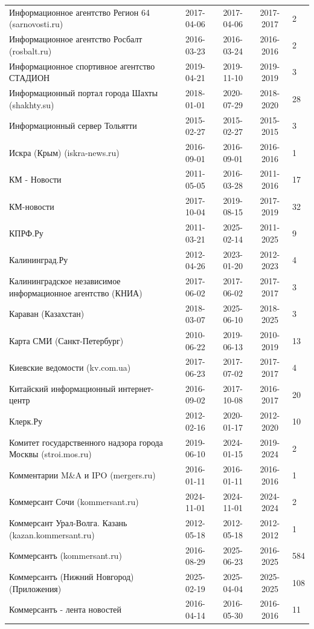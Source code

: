 \begin{longtable}{p{6cm}cccp{2cm}}
Информационное агентство Регион 64 (sarnovosti.ru) & 2017-04-06 & 2017-04-06 & 2017-2017 & 2\\
Информационное агентство Росбалт (rosbalt.ru) & 2016-03-23 & 2016-03-24 & 2016-2016 & 2\\
Информационное спортивное агентство СТАДИОН & 2019-04-21 & 2019-11-10 & 2019-2019 & 3\\
Информационный портал города Шахты (shakhty.su) & 2018-01-01 & 2020-07-29 & 2018-2020 & 28\\
Информационный сервер Тольятти & 2015-02-27 & 2015-02-27 & 2015-2015 & 3\\
Искра (Крым) (iskra-news.ru) & 2016-09-01 & 2016-09-01 & 2016-2016 & 1\\
КМ - Новости & 2011-05-05 & 2016-03-28 & 2011-2016 & 17\\
КМ-новости & 2017-10-04 & 2019-08-15 & 2017-2019 & 32\\
КПРФ.Ру & 2011-03-21 & 2025-02-14 & 2011-2025 & 9\\
Калининград.Ру & 2012-04-26 & 2023-01-20 & 2012-2023 & 4\\
Калининградское независимое информационное агентство (КНИА) & 2017-06-02 & 2017-06-02 & 2017-2017 & 3\\
Караван (Казахстан) & 2018-03-07 & 2025-06-10 & 2018-2025 & 3\\
Карта СМИ (Санкт-Петербург) & 2010-06-22 & 2019-06-13 & 2010-2019 & 13\\
Киевские ведомости (kv.com.ua) & 2017-06-23 & 2017-07-02 & 2017-2017 & 4\\
Китайский информационный интернет-центр & 2016-09-02 & 2017-10-08 & 2016-2017 & 20\\
Клерк.Ру & 2012-02-16 & 2020-01-17 & 2012-2020 & 10\\
Комитет государственного надзора города Москвы (stroi.mos.ru) & 2019-06-10 & 2024-01-15 & 2019-2024 & 2\\
Комментарии M\&A и IPO (mergers.ru) & 2016-01-11 & 2016-01-11 & 2016-2016 & 1\\
Коммерсант Сочи (kommersant.ru) & 2024-11-01 & 2024-11-01 & 2024-2024 & 2\\
Коммерсант Урал-Волга. Казань (kazan.kommersant.ru) & 2012-05-18 & 2012-05-18 & 2012-2012 & 1\\
Коммерсантъ (kommersant.ru) & 2016-08-29 & 2025-06-23 & 2016-2025 & 584\\
Коммерсантъ (Нижний Новгород) (Приложения) & 2025-02-19 & 2025-04-04 & 2025-2025 & 108\\
Коммерсантъ - лента новостей & 2016-04-14 & 2016-05-30 & 2016-2016 & 11\\

\end{longtable}
